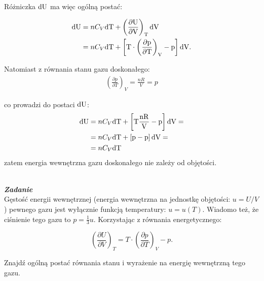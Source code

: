 \documentclass[11pt,a4paper]{article}
\newcounter{zadanie}\newcommand{\zadanie}[1][]{\addtocounter{zadanie}{1} ~\\  {\bf \emph{Zadanie \arabic{zadanie} #1 }} \\}
\begin{document}
Różniczka $\rm{d}U$ ma więc ogólną postać:

\begin{align}
  \rm{d} U &= n C_V \rm{d}T + \left(\frac{\partial U}{\partial V} \right)_T \rm{d}V \\
 &= n C_V \rm{d}T + \left[    T \cdot \left(\frac{\partial p}{\partial T}\right)_V - p\right] \rm{d}V.
\end{align}

 Natomiast z równania stanu gazu doskonałego: 
 \begin{align}
 \left(\frac{\partial p}{\partial T}\right)_V  = \frac{nR}{V} = p
 \end{align}
 
 co prowadzi do postaci $\rm{d} U$:
 \begin{align}
  \rm{d} U &= n C_V \rm{d}T + \left[T\frac{nR}{V} - p\right] \rm{d}V = \\
  &= n C_V \rm{d}T + \left[p - p\right] \rm{d}V = \\
  &= n C_V \rm{d}T
\end{align}  
 zatem energia wewnętrzna gazu doskonałego nie zależy od objętości.

 
\newpage
\zadanie
Gęstość energii wewnętrznej (energia wewnętrzna na jednostkę objętości: $u = U/V$) pewnego gazu jest 
wyłącznie funkcją temperatury: $u = u(T)$. Wiadomo też, że ciśnienie tego gazu to $p=\frac{1}{3}u$. 
Korzystając z równania energetycznego: 

\[ \left(\frac{\partial U}{\partial V}\right)_T = 
   T \cdot \left(\frac{\partial p}{\partial T}\right)_V - p.\]

Znajdź ogólną postać równania stanu i wyrażenie na energię wewnętrzną tego gazu.
\end{document}
